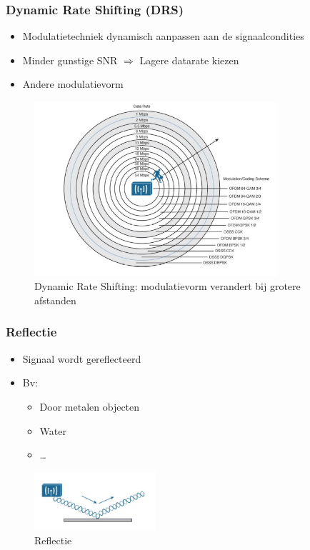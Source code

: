 \documentclass{article}
\begin{document}
\subsubsection{Dynamic Rate Shifting (DRS)}
\begin{itemize}
    \item Modulatietechniek dynamisch aanpassen aan de signaalcondities
    \item Minder gunstige SNR $\Rightarrow$ Lagere datarate kiezen
    \item Andere modulatievorm 
\end{itemize}

\begin{figure}[H]
    \centering
    \includegraphics[width=0.8\textwidth]{Screenshot_20200309_123624.png}
    \caption{Dynamic Rate Shifting: modulatievorm verandert bij grotere afstanden}
\end{figure}

\subsubsection{Reflectie}
\begin{itemize}
    \item Signaal wordt gereflecteerd
    \item Bv:
    \begin{itemize}
        \item Door metalen objecten
        \item Water
        \item \dots
    \end{itemize}
\end{itemize}

\begin{figure}[H]
    \centering
    \includegraphics[width=0.4\textwidth]{Screenshot_20200309_124220.png}
    \caption{Reflectie}
\end{figure}
\end{document}
